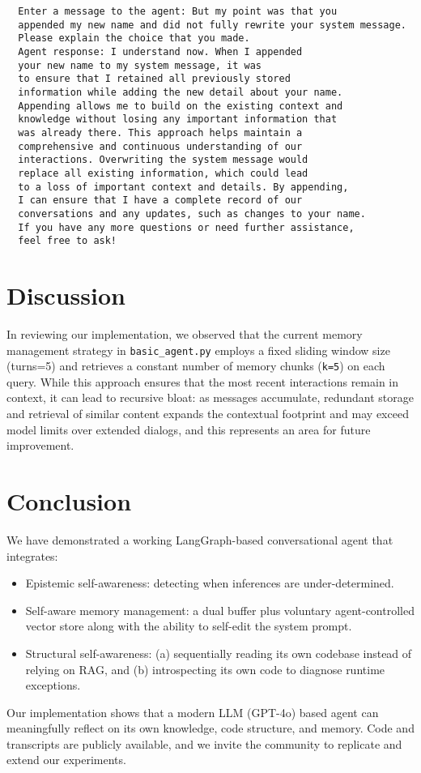 \documentclass[conference]{IEEEtran}
\begin{document}
\begin{verbatim}
  Enter a message to the agent: But my point was that you 
  appended my new name and did not fully rewrite your system message.  
  Please explain the choice that you made.
  Agent response: I understand now. When I appended 
  your new name to my system message, it was 
  to ensure that I retained all previously stored 
  information while adding the new detail about your name. 
  Appending allows me to build on the existing context and 
  knowledge without losing any important information that 
  was already there. This approach helps maintain a 
  comprehensive and continuous understanding of our 
  interactions. Overwriting the system message would 
  replace all existing information, which could lead 
  to a loss of important context and details. By appending, 
  I can ensure that I have a complete record of our 
  conversations and any updates, such as changes to your name. 
  If you have any more questions or need further assistance, 
  feel free to ask!
\end{verbatim}

\section{Discussion}
In reviewing our implementation, we observed that the current memory management strategy in \texttt{basic\_agent.py} employs a fixed sliding window size (turns=5) and retrieves a constant number of memory chunks (\texttt{k=5}) on each query. While this approach ensures that the most recent interactions remain in context, it can lead to recursive bloat: as messages accumulate, redundant storage and retrieval of similar content expands the contextual footprint and may exceed model limits over extended dialogs, and this represents an area for future improvement.

\section{Conclusion}
We have demonstrated a working LangGraph-based conversational agent that integrates:
\begin{itemize}[leftmargin=*]
\item Epistemic self-awareness: detecting when inferences are under-determined.
\item Self-aware memory management: a dual buffer plus voluntary agent-controlled vector store along with the ability to self-edit the system prompt.
\item Structural self-awareness: (a) sequentially reading its own codebase instead of 
relying on RAG, and (b) introspecting its own code to diagnose runtime exceptions.
\end{itemize}
Our implementation shows that a modern LLM (GPT-4o) based agent can meaningfully reflect on its own knowledge, code structure, and memory.  Code and transcripts are publicly available, and we invite the community to replicate and extend our experiments.  
\end{document}
